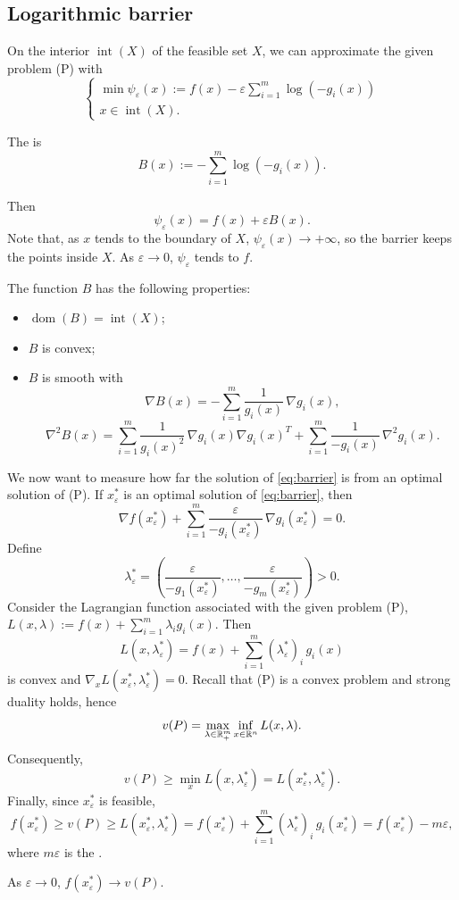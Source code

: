 \subsection{Logarithmic barrier}

On the interior $\operatorname{int}(X)$ of the feasible set $X$, we can approximate the given problem (P) with
\begin{equation}\label{eq:barrier}
\begin{cases}
\displaystyle \min \psi_\varepsilon(x) := f(x) - \varepsilon \sum_{i=1}^{m} \log(-g_i(x))\\[1ex]
x \in \operatorname{int}(X).
\end{cases}
\end{equation}

\begin{definition}
The  is
\[
B(x) := -\sum_{i=1}^{m} \log(-g_i(x)).
\]
\end{definition}
Then
\[
\psi_\varepsilon(x) = f(x) + \varepsilon B(x).
\]
Note that, as $x$ tends to the boundary of $X$, $\psi_\varepsilon(x) \to +\infty$, so the barrier keeps the points inside $X$. As $\varepsilon \to 0$, $\psi_\varepsilon$ tends to $f$.

The function $B$ has the following properties:
\begin{itemize}
    \item $\operatorname{dom}(B) = \operatorname{int}(X)$;
    \item $B$ is convex;
    \item $B$ is smooth with
    \[
    \nabla B(x) = -\sum_{i=1}^{m} \frac{1}{g_i(x)}\, \nabla g_i(x),
    \]
    \[
    \nabla^2 B(x) = \sum_{i=1}^{m} \frac{1}{g_i(x)^2}\, \nabla g_i(x) \nabla g_i(x)^T + \sum_{i=1}^{m} \frac{1}{-g_i(x)}\, \nabla^2 g_i(x).
    \]
\end{itemize}

We now want to measure how far the solution of \eqref{eq:barrier} is from an optimal solution of (P). If $x_\varepsilon^*$ is an optimal solution of \eqref{eq:barrier}, then
\[
\nabla f(x_\varepsilon^*) + \sum_{i=1}^{m} \frac{\varepsilon}{-g_i(x_\varepsilon^*)}\, \nabla g_i(x_\varepsilon^*) = 0.
\]
Define
\[
\lambda_\varepsilon^* = \left( \frac{\varepsilon}{-g_1(x_\varepsilon^*)}, \dots, \frac{\varepsilon}{-g_m(x_\varepsilon^*)} \right) > 0.
\]
Consider the Lagrangian function associated with the given problem (P), $L(x, \lambda) := f(x) + \sum_{i=1}^{m} \lambda_i g_i(x)$. Then
\[
L(x, \lambda_\varepsilon^*) = f(x) + \sum_{i=1}^{m} (\lambda_\varepsilon^*)_i\, g_i(x)
\]
is convex and $\nabla_x L(x_\varepsilon^*, \lambda_\varepsilon^*) = 0$. Recall that (P) is a convex problem and strong duality holds, hence
\[
v(P) = \max_{\lambda \in \mathbb{R}^m_+} \inf_{x \in \mathbb{R}^n} L(x, \lambda).
\]
Consequently,
\[
v(P) \ge \min_x L(x, \lambda_\varepsilon^*) = L(x_\varepsilon^*, \lambda_\varepsilon^*).
\]
Finally, since $x_\varepsilon^*$ is feasible,
\[
f(x_\varepsilon^*) \ge v(P) \ge L(x_\varepsilon^*, \lambda_\varepsilon^*) = f(x_\varepsilon^*) + \sum_{i=1}^{m} (\lambda_\varepsilon^*)_i\, g_i(x_\varepsilon^*) = f(x_\varepsilon^*) - m\varepsilon,
\]
where $m\varepsilon$ is the .

\begin{remark}
As $\varepsilon \to 0$, $f(x_\varepsilon^*) \to v(P)$.
\end{remark}
